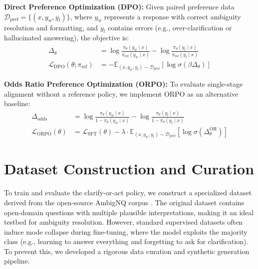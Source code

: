\documentclass{article}
\theoremstyle{plain}
\theoremstyle{definition}
\theoremstyle{remark}
\begin{document}
\textbf{Direct Preference Optimization (DPO):} Given paired preference data $\mathcal{D}_{\text{pref}} = \{(x, y_w, y_l)\}$, where $y_w$ represents a response with correct ambiguity resolution and formatting, and $y_l$ contains errors (e.g., over-clarification or hallucinated answering), the objective is:
\begin{align}
\Delta_\theta
&=
\log \frac{\pi_\theta(y_w \mid x)}
{\pi_{\text{ref}}(y_w \mid x)}
-
\log \frac{\pi_\theta(y_l \mid x)}
{\pi_{\text{ref}}(y_l \mid x)}
\\
\mathcal{L}_{\text{DPO}}(\theta; \pi_{\text{ref}})
&=
-\mathbb{E}_{(x, y_w, y_l) \sim \mathcal{D}_{\text{pref}}}
\left[
\log \sigma(\beta \Delta_\theta)
\right]
\end{align}

\textbf{Odds Ratio Preference Optimization (ORPO):} To evaluate single-stage alignment without a reference policy, we implement ORPO as an alternative baseline:
\begin{align}
\Delta_{\text{odds}}
&=
\log \frac{\pi_\theta(y_w \mid x)}
{1 - \pi_\theta(y_w \mid x)}
-
\log \frac{\pi_\theta(y_l \mid x)}
{1 - \pi_\theta(y_l \mid x)}
\\
\mathcal{L}_{\text{ORPO}}(\theta)
&=
\mathcal{L}_{\text{SFT}}(\theta)
-
\lambda \cdot
\mathbb{E}_{(x, y_w, y_l) \sim \mathcal{D}_{\text{pref}}}
\left[
\log \sigma \left(
\Delta_\theta^{\text{OR}}
\right)
\right]
\end{align}

\section{Dataset Construction and Curation}
\label{sec:dataset}
To train and evaluate the clarify-or-act policy, we construct a specialized dataset derived from the open-source AmbigNQ corpus \cite{min2020ambigqa}. The original dataset contains open-domain questions with multiple plausible interpretations, making it an ideal testbed for ambiguity resolution. However, standard supervised datasets often induce mode collapse during fine-tuning, where the model exploits the majority class (e.g., learning to answer everything and forgetting to ask for clarification). To prevent this, we developed a rigorous data curation and synthetic generation pipeline.
\end{document}
